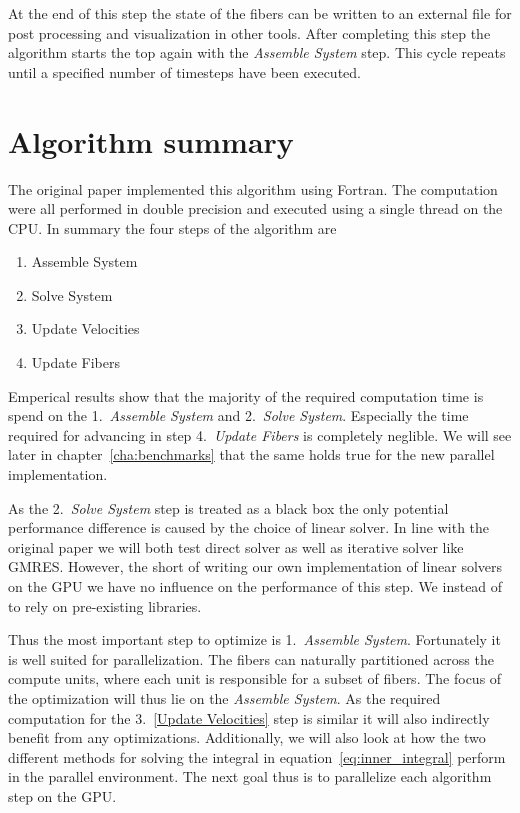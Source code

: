 \documentclass[a4paper,11pt]{kth-mag}
\begin{document}
At the end of this step the state of the fibers can be written to an external file for post processing and visualization in other tools. After completing this step the algorithm starts the top again with the \emph{Assemble System} step. This cycle repeats until a specified number of timesteps have been executed.

\section{Algorithm summary}

The original paper implemented this algorithm using Fortran. The computation were all performed in double precision and executed using a single thread on the CPU. In summary the four steps of the algorithm are
\begin{enumerate}
  \item Assemble System
  \item Solve System
  \item Update Velocities
  \item Update Fibers
\end{enumerate}

Emperical results show that the majority of the required computation time is spend on the 1.~\emph{Assemble System} and 2.~\emph{Solve System}. Especially the time required for advancing in step 4.~\emph{Update Fibers} is completely neglible. We will see later in chapter~\ref{cha:benchmarks} that the same holds true for the new parallel implementation.

As the 2.~\emph{Solve System} step is treated as a black box the only potential performance difference is caused by the choice of linear solver. In line with the original paper we will both test direct solver as well as iterative solver like GMRES. However, the short of writing our own implementation of linear solvers on the GPU we have no influence on the performance of this step. We instead of to rely on pre-existing libraries.

Thus the most important step to optimize is 1.~\emph{Assemble System}. Fortunately it is well suited for parallelization. The fibers can naturally partitioned across the compute units, where each unit is responsible for a subset of fibers. The focus of the optimization will thus lie on the \emph{Assemble System}. As the required computation for the 3.~\ref{Update Velocities} step is similar it will also indirectly benefit from any optimizations. Additionally, we will also look at how the two different methods for solving the integral in equation~\ref{eq:inner_integral} perform in the parallel environment. The next goal thus is to parallelize each algorithm step on the GPU.
\end{document}

